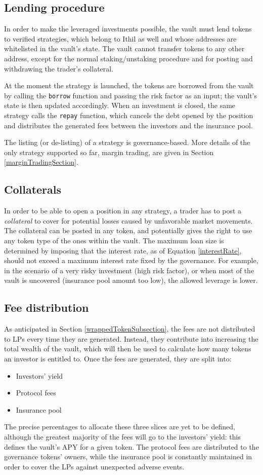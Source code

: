 \documentclass [10pt, fancyhdr, twoside] {article}
\begin{document}
\subsection{Lending procedure}
In order to make the leveraged investments possible, the vault must lend tokens to verified strategies, which belong to Ithil as well and whose addresses are whitelisted in the vault's state. The vault cannot transfer tokens to any other address, except for the normal staking/unstaking procedure and for posting and withdrawing the trader's collateral.

At the moment the strategy is launched, the tokens are borrowed from the vault by calling the \verb|borrow| function and passing the risk factor as an input; the vault's state is then updated accordingly. When an investment is closed, the same strategy calls the \verb|repay| function, which cancels the debt opened by the position and distributes the generated fees between the investors and the insurance pool.

The listing (or de-listing) of a strategy is governance-based. More details of the only strategy supported so far, margin trading, are given in Section \ref{marginTradingSection}.

\subsection{Collaterals}\label{collateralsSubsection}
In order to be able to open a position in any strategy, a trader has to post a \textit{collateral} to cover for potential losses caused by unfavorable market movements. The collateral can be posted in any token, and potentially gives the right to use any token type of the ones within the vault. The maximum loan size is determined by imposing that the interest rate, as of Equation \eqref{interestRate}, should not exceed a maximum interest rate fixed by the governance. For example, in the scenario of a very risky investment (high risk factor), or when most of the vault is uncovered (insurance pool amount too low), the allowed leverage is lower.

\subsection{Fee distribution}
As anticipated in Section \ref{wrappedTokenSubsection}, the fees are not distributed to LPs every time they are generated. Instead, they contribute into increasing the total wealth of the vault, which will then be used to calculate how many tokens an investor is entitled to. Once the fees are generated, they are split into:
\begin{itemize}
\item Investors' yield
\item Protocol fees
\item Insurance pool
\end{itemize}
The precise percentages to allocate these three slices are yet to be defined, although the greatest majority of the fees will go to the investors' yield: this defines the vault's APY for a given token. The protocol fees are distributed to the governance tokens' owners, while the insurance pool is constantly maintained in order to cover the LPs against unexpected adverse events.
\end{document}
